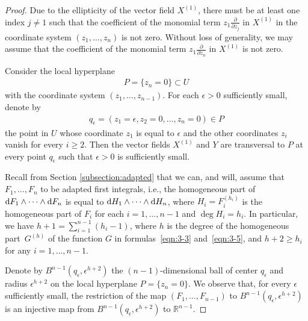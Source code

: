 \documentclass[11pt]{article}
\numberwithin{equation}{section}
\begin{document}
\begin{proof}
Due to the ellipticity of the vector f\/ield $X^{(1)}$, there must be at least
one index $j \neq 1$ such that
the coef\/f\/icient of the monomial term $z_1 \frac{\partial}{\partial z_j}$ in $X^{(1)}$ in the coordinate system $(z_1,\dots, z_n)$ is not zero.
Without loss of generality, we may assume that the coef\/f\/icient of
the monomial term $z_1 \frac{\partial}{\partial z_n}$ in $X^{(1)}$
is not zero.

Consider the local hyperplane
\begin{gather*} P = \{z_n = 0\} \subset U\end{gather*}
with the coordinate system $(z_1,\dots, z_{n-1})$.
For each $\epsilon > 0$ suf\/f\/iciently small, denote by
\begin{gather*} q_{\epsilon} = (z_1= \epsilon, z_2=0,\dots,z_n=0) \in P\end{gather*}
the point in $U$ whose coordinate $z_1$ is equal to $\epsilon$
and the other coordinates $z_i$ vanish for every $i \geq 2$.
Then the vector f\/ields $X^{(1)}$ and $Y$ are transversal to $P$
at every point $q_{\epsilon}$ such that $\epsilon > 0$ is suf\/f\/iciently
small.

Recall from Section \ref{subsection:adapted} that we can, and will,
assume that $F_1,\dots, F_n$ to be adapted f\/irst integrals, i.e.,
the homogeneous part of ${\rm d}F_1 \wedge \dots \wedge {\rm d} F_n$ is equal to
${\rm d}H_1 \wedge \dots \wedge {\rm d} H_n$, where $H_i = F_i^{(h_i)}$ is the homogeneous part
of $F_i$ for each $i=1,\dots, n-1$ and $\deg H_i = h_i$.
In particular, we have
$ h + 1 = \sum\limits_{i=1}^{n-1} (h_i - 1)$,
where $h$ is the degree of the homogeneous part~$G^{(h)}$
of the function $G$ in formulas~\eqref{eqn:3-3} and~\eqref{eqn:3-5},
and $h+2 \geq h_i$ for any $i=1,\dots, n-1$.

Denote by $B^{n-1}(q_\epsilon, \epsilon^{h+2})$ the
$(n-1)$-dimensional ball of center $q_\epsilon$ and radius $\epsilon^{h+2}$
on the local hyperplane $ P = \{z_n = 0\}$. We observe that, for every
$\epsilon $ suf\/f\/iciently small, the restriction of the map
$(F_1,\dots, F_{n-1})$ to $B^{n-1}(q_\epsilon, \epsilon^{h+2})$
is an injective map
from $B^{n-1}(q_\epsilon, \epsilon^{h+2})$ to $\mathbb{R}^{n-1}$.


\end{proof}
\end{document}
